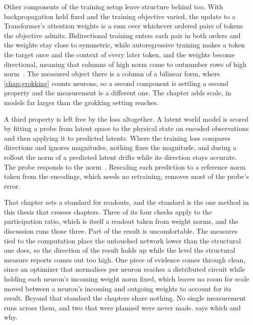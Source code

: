 Other components of the training setup leave structure behind too. With
backpropagation held fixed and the training objective varied, the update to a
Transformer's attention weights is a sum over whichever ordered pairs of
tokens the objective admits. Bidirectional training enters each pair in both
orders and the weights stay close to symmetric, while autoregressive training
makes a token the target once and the context of every later token, and the
weights become directional, meaning that columns of high norm come to
outnumber rows of high norm~\cite{saponati_underlying_2025}. The measured object
there is a column of a bilinear form, where \cref{chap:grokking} counts
neurons, so a second component is settling a second property and the
measurement is a different one. The chapter adds scale, in models far larger
than the grokking setting reaches.

A third property is left free by the loss altogether. A latent world model is
scored by fitting a probe from latent space to the physical state on encoded
observations and then applying it to predicted latents. Where the training
loss compares directions and ignores magnitudes, nothing fixes the magnitude,
and during a rollout the norm of a predicted latent drifts while its direction
stays accurate. The probe responds to the norm~\cite{sager_bounded_2026}.
Rescaling each prediction to a reference norm taken from the encodings, which
needs no retraining, removes most of the probe's error.

That chapter sets a standard for readouts, and the standard is the one method
in this thesis that crosses chapters. Three of its four checks apply to the
participation ratio, which is itself a readout taken from weight norms, and
the discussion runs those three. Part of the result is uncomfortable. The measures tied to the computation place the untouched
network lower than the structural one does, so the direction of the result
holds up while the level the structural measure reports comes out too high. One piece of evidence
comes through clean, since an optimizer that normalises per neuron reaches a
distributed circuit while holding each neuron's incoming weight norm fixed,
which leaves no room for scale moved between a neuron's incoming and outgoing
weights to account for its result. Beyond that standard the chapters share
nothing. No single measurement runs across them, and two that were planned
were never made.  says which and why.

